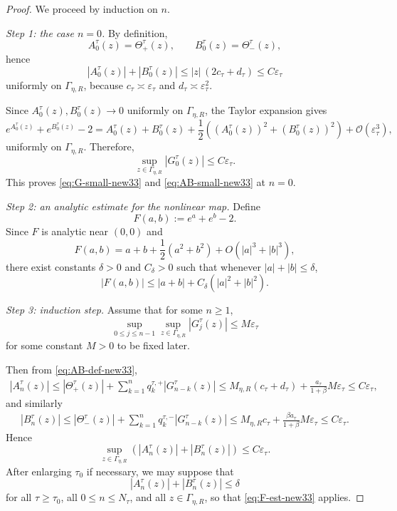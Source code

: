\documentclass[letterpaper]{article}
\numberwithin{equation}{section}
\theoremstyle{definition}
\theoremstyle{remark}
\begin{document}
\begin{proof}
We proceed by induction on $n$.

\medskip
\noindent
\emph{Step 1: the case $n=0$.}
By definition,
\[
  A_0^\tau(z)=\Theta_+^\tau(z),\qquad B_0^\tau(z)=\Theta_-^\tau(z),
\]
hence
\[
  |A_0^\tau(z)|+|B_0^\tau(z)|
  \le |z|\,(2c_\tau+d_\tau)
  \le C\varepsilon_\tau
\]
uniformly on $\Gamma_{\eta,R}$, because $c_\tau\asymp \varepsilon_\tau$ and
$d_\tau\asymp \varepsilon_\tau^2$.

Since $A_0^\tau(z),B_0^\tau(z)\to0$ uniformly on $\Gamma_{\eta,R}$, the Taylor expansion gives
\[
  e^{A_0^\tau(z)}+e^{B_0^\tau(z)}-2
  =A_0^\tau(z)+B_0^\tau(z)
   +\frac12\left((A_0^\tau(z))^2+(B_0^\tau(z))^2\right)
   +\mathcal O(\varepsilon_\tau^3),
\]
uniformly on $\Gamma_{\eta,R}$. Therefore,
\[
  \sup_{z\in\Gamma_{\eta,R}}|G_0^\tau(z)|\le C\varepsilon_\tau.
\]
This proves \eqref{eq:G-small-new33} and \eqref{eq:AB-small-new33} at $n=0$.

\medskip
\noindent
\emph{Step 2: an analytic estimate for the nonlinear map.}
Define
\[
  F(a,b):=e^a+e^b-2.
\]
Since $F$ is analytic near $(0,0)$ and
\[
  F(a,b)=a+b+\frac12(a^2+b^2)+O(|a|^3+|b|^3),
\]
there exist constants $\delta>0$ and $C_\delta>0$ such that whenever
$|a|+|b|\le \delta$,
\begin{equation}\label{eq:F-est-new33}
  |F(a,b)|\le |a+b|+C_\delta\left(|a|^2+|b|^2\right).
\end{equation}

\medskip
\noindent
\emph{Step 3: induction step.}
Assume that for some $n\ge1$,
\begin{equation}\label{eq:ind-hyp-G-new33}
  \sup_{0\le j\le n-1}\sup_{z\in\Gamma_{\eta,R}}|G_j^\tau(z)|
  \le M\varepsilon_\tau
\end{equation}
for some constant $M>0$ to be fixed later.

Then from \eqref{eq:AB-def-new33},
\begin{align*}
  |A_n^\tau(z)|
  \le |\Theta_+^\tau(z)|+\sum_{k=1}^n q_k^{\tau,+}|G_{n-k}^\tau(z)|
  \le M_{\eta,R}(c_\tau+d_\tau)+\frac{a_\tau}{1+\beta}M\varepsilon_\tau
   \le C\varepsilon_\tau,
\end{align*}
and similarly
\begin{align*}
  |B_n^\tau(z)|
  \le |\Theta_-^\tau(z)|+\sum_{k=1}^n q_k^{\tau,-}|G_{n-k}^\tau(z)|
 \le M_{\eta,R}c_\tau+\frac{\beta a_\tau}{1+\beta}M\varepsilon_\tau
   \le C\varepsilon_\tau.
\end{align*}
Hence
\[
  \sup_{z\in\Gamma_{\eta,R}}\left(|A_n^\tau(z)|+|B_n^\tau(z)|\right)\le C\varepsilon_\tau.
\]
After enlarging $\tau_0$ if necessary, we may suppose that
\[
  |A_n^\tau(z)|+|B_n^\tau(z)|\le \delta
\]
for all $\tau\ge\tau_0$, all $0\le n\le N_\tau$, and all $z\in\Gamma_{\eta,R}$, so that
\eqref{eq:F-est-new33} applies.


\end{proof}
\end{document}
